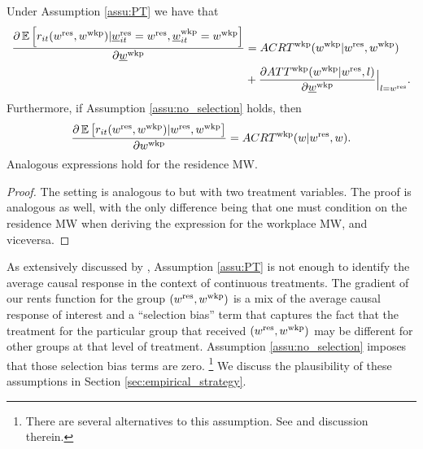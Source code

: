 \begin{prop}[Identification]\label{prop:PO_identification}
    Under Assumption \ref{assu:PT} we have that
    \begin{align*}
        \frac{\partial \operatorname{\mathbb{E}}\left[r_{it}(w^{\text{res}}, w^{\text{wkp}}) 
                              | \underline{w}_{it}^{\text{res}}=w^{\text{res}}, \underline{w}_{it}^{\text{wkp}}=w^{\text{wkp}}\right]}
             {\partial \underline{w}^{\text{wkp}}} 
              & = ACRT^{\text{wkp}}(w^{\text{wkp}} | w^{\text{res}}, w^{\text{wkp}}) \\
         &  + \frac{\partial ATT^{\text{wkp}}(w^{\text{wkp}} | w^{\text{res}}, l)}{\partial \underline{w}^{\text{wkp}}} \Big|_{l = w^{\text{res}}} . \\
        \end{align*}
    Furthermore, if Assumption \ref{assu:no_selection} holds, then
    \begin{equation*}
        \frac{\partial \operatorname{\mathbb{E}}\left[r_{it}(w^{\text{res}}, w^{\text{wkp}}) | w^{\text{res}}, w^{\text{wkp}}\right]}
        {\partial w^{\text{wkp}}} 
       = ACRT^{\text{wkp}}(w | w^{\text{res}}, w) .
    \end{equation*}
    Analogous expressions hold for the residence MW.
\end{prop}
\begin{proof}
    The setting is analogous to \textcite{CallawayEtAl2021} but with two 
    treatment variables.
    The proof is analogous as well, with the only difference being that one 
    must condition on the residence MW when deriving the expression for the 
    workplace MW, and viceversa.
\end{proof}

As extensively discussed by \textcite{CallawayEtAl2021}, Assumption \ref{assu:PT} 
is not enough to identify the average causal response in the context of 
continuous treatments.
The gradient of our rents function for the group $(w^{\text{res}}, w^{\text{wkp}})$ is a mix
of the average causal response of interest and a ``selection bias'' term that
captures the fact that the treatment for the particular group that received
$(w^{\text{res}}, w^{\text{wkp}})$ may be different for other groups at that level of 
treatment.
Assumption \ref{assu:no_selection} imposes that those selection bias
terms are zero.%
\footnote{There are several alternatives to this assumption. 
See \textcite[][Section 3.3]{CallawayEtAl2021} and discussion therein.}
We discuss the plausibility of these assumptions in Section 
\ref{sec:empirical_strategy}.


